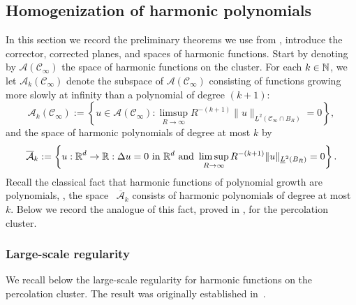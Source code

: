 \documentclass[12pt]{amsart}
\numberwithin{equation}{section}
\begin{document}
	\subsection{Homogenization of harmonic polynomials}
	In this section we record the preliminary theorems we use from \cite{dario-corrector, dario-gu-green,armstrong-dario-2018}, introduce the corrector, corrected planes, and spaces of harmonic functions. 
	Start by denoting by $\mathcal{A}(\mathscr{C}_{\infty})$ the space of harmonic functions on the cluster. For each $k \in \operatorname{\mathbb{N}}$, we let $\mathcal{A}_k(\mathscr{C}_\infty)$ denote the subspace 
	of $\mathcal{A}(\mathscr{C}_{\infty})$ consisting of functions growing more slowly at infinity than a polynomial of degree $(k+1)$: 
	\[
	\mathcal{A}_k(\mathscr{C}_{\infty}) := \left\{ u \in \mathcal{A}(\mathscr{C}_{\infty}) : \limsup_{R \to \infty} R^{-(k+1)} \|u\|_{\underline{L}^2(\mathscr{C}_{\infty} \cap B_R)} = 0 \right \},
	\]
	and the space of harmonic polynomials of degree at most $k$ by 
	\[
	\overline{\mathcal{A}}_k := \left\{ u : \operatorname{\mathbb{R}}^d \to \operatorname{\mathbb{R}} : \Delta u = 0 ~\mbox{in} ~\mathbb{R}^d ~\mbox{and}~ \limsup_{R \to \infty} R^{-(k+1)} \|u\|_{\underline{L}^2(B_R)} = 0 \right \}.
	\]
	Recall the classical fact that harmonic functions of polynomial growth are polynomials, \ie, the space ~$\overline{\mathcal{A}}_k$ consists of harmonic polynomials of degree at most~$k$. Below we record the analogue of this fact, proved in \cite{armstrong-dario-2018}, for the percolation cluster. 
	
	
	
	
	\subsubsection{Large-scale regularity}
	
	We recall below the large-scale regularity for harmonic functions on the percolation cluster. The result was originally established in~\cite[Theorem 1.2]{armstrong-dario-2018}.
	
\end{document}
